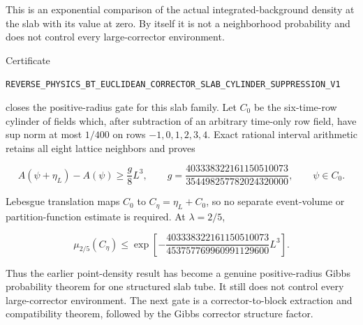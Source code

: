 \documentclass[11pt]{article}
\theoremstyle{definition}
\theoremstyle{remark}
\newcommand{\cert}[1]{\nolinkurl{#1}}
\begin{document}
This is an exponential comparison of the actual integrated-background
density at the slab with its value at zero.  By itself it is not a
neighborhood probability and does not control every large-corrector
environment.

Certificate

\cert{REVERSE_PHYSICS_BT_EUCLIDEAN_CORRECTOR_SLAB_CYLINDER_SUPPRESSION_V1}

closes the positive-radius gate for this slab family.  Let \(C_0\) be the
six-time-row cylinder of fields which, after subtraction of an arbitrary
time-only row field, have sup norm at most \(1/400\) on rows
\(-1,0,1,2,3,4\).  Exact rational interval arithmetic retains all eight
lattice neighbors and proves

\[
 A(\psi+\eta_L)-A(\psi)\geq\frac{g}{8}L^3,
 \qquad
 g=\frac{403338322161150510073}{354498257782024320000},
 \qquad \psi\in C_0.
\]

Lebesgue translation maps \(C_0\) to \(C_\eta=\eta_L+C_0\), so no separate
event-volume or partition-function estimate is required.  At
\(\lambda=2/5\),

\[
 \mu_{2/5}(C_\eta)
 \leq\exp\left[-
 \frac{403338322161150510073}{453757769960991129600}L^3\right].
\]

Thus the earlier point-density result has become a genuine positive-radius
Gibbs probability theorem for one structured slab tube.  It still does not
control every large-corrector environment.  The next gate is a
corrector-to-block extraction and compatibility theorem, followed by the
Gibbs corrector structure factor.
\end{document}
